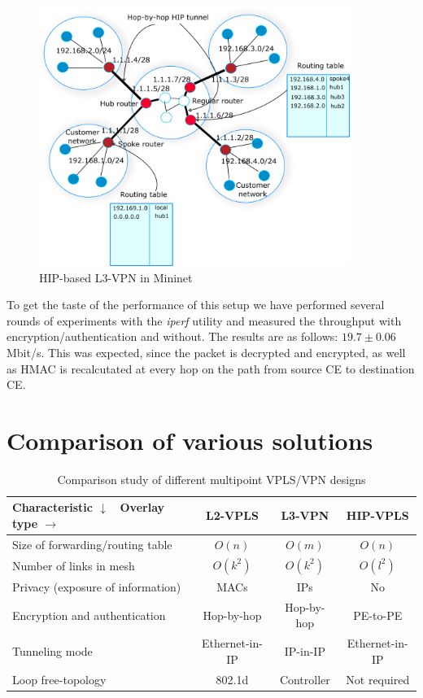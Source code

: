 \begin{figure}[!ht]
    \centering
    \includegraphics[width=0.9\textwidth]{graphics/l3-vpn.png}
    \caption{HIP-based L3-VPN in Mininet}
    \label{fig:l3vpn}
\end{figure}

To get the taste of the performance of this setup we have performed 
several rounds of experiments with the {\it iperf} utility and measured
the throughput with encryption/authentication and without. The results 
are as follows: $19.7 \pm 0.06$ Mbit/s. This was expected, since the packet
is decrypted and encrypted, as well as HMAC is recalcutated at every hop on 
the path from source CE to destination CE.

\section{Comparison of various solutions}

\begin{table}
    \small
    \begin{tabular}{|l|c|c|c|}
    \hline
    Characteristic $\downarrow$ \ Overlay type $\rightarrow$ & L2-VPLS & L3-VPN & HIP-VPLS \\\hline
    Size of forwarding/routing table & $O(n)$ & $O(m)$ & $O(n)$\\\hline
    Number of links in mesh & $O(k^2)$ & $O(k^2)$ & $O(l^2)$ \\\hline
    Privacy (exposure of information) & MACs & IPs & No \\\hline
    Encryption and authentication & Hop-by-hop & Hop-by-hop & PE-to-PE \\\hline
    Tunneling mode & Ethernet-in-IP & IP-in-IP & Ethernet-in-IP \\\hline
    Loop free-topology & 802.1d & Controller & Not required \\\hline
    \end{tabular}
    \caption {Comparison study of different multipoint VPLS/VPN designs}
    \label{analysis}
\end{table}

